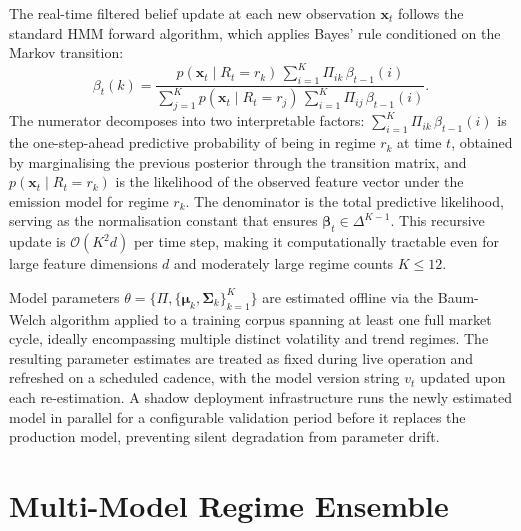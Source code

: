 \documentclass[12pt,openany]{book}
\numberwithin{equation}{chapter}
\theoremstyle{plain}
\theoremstyle{definition}
\theoremstyle{remark}
\begin{document}
The real-time filtered belief update at each new observation $\mathbf{x}_t$ follows the standard HMM forward algorithm, which applies Bayes' rule conditioned on the Markov transition:
\begin{equation}
    \beta_t(k) = \frac{p(\mathbf{x}_t \mid R_t = r_k)\, \sum_{i=1}^{K} \Pi_{ik}\, \beta_{t-1}(i)}
    {\displaystyle\sum_{j=1}^{K} p(\mathbf{x}_t \mid R_t = r_j)\, \sum_{i=1}^{K} \Pi_{ij}\, \beta_{t-1}(i)}.
    \label{eq:hmm_filter}
\end{equation}
The numerator decomposes into two interpretable factors: $\sum_{i=1}^{K} \Pi_{ik}\, \beta_{t-1}(i)$ is the one-step-ahead predictive probability of being in regime $r_k$ at time $t$, obtained by marginalising the previous posterior through the transition matrix, and $p(\mathbf{x}_t \mid R_t = r_k)$ is the likelihood of the observed feature vector under the emission model for regime $r_k$. The denominator is the total predictive likelihood, serving as the normalisation constant that ensures $\boldsymbol{\beta}_t \in \Delta^{K-1}$. This recursive update is $\mathcal{O}(K^2 d)$ per time step, making it computationally tractable even for large feature dimensions $d$ and moderately large regime counts $K \leq 12$.

Model parameters $\theta = \{\Pi, \{\boldsymbol{\mu}_k, \boldsymbol{\Sigma}_k\}_{k=1}^K\}$ are estimated offline via the Baum-Welch algorithm applied to a training corpus spanning at least one full market cycle, ideally encompassing multiple distinct volatility and trend regimes. The resulting parameter estimates are treated as fixed during live operation and refreshed on a scheduled cadence, with the model version string $v_t$ updated upon each re-estimation. A shadow deployment infrastructure runs the newly estimated model in parallel for a configurable validation period before it replaces the production model, preventing silent degradation from parameter drift.

\section{Multi-Model Regime Ensemble}
\label{sec:regime_ensemble}
\end{document}
